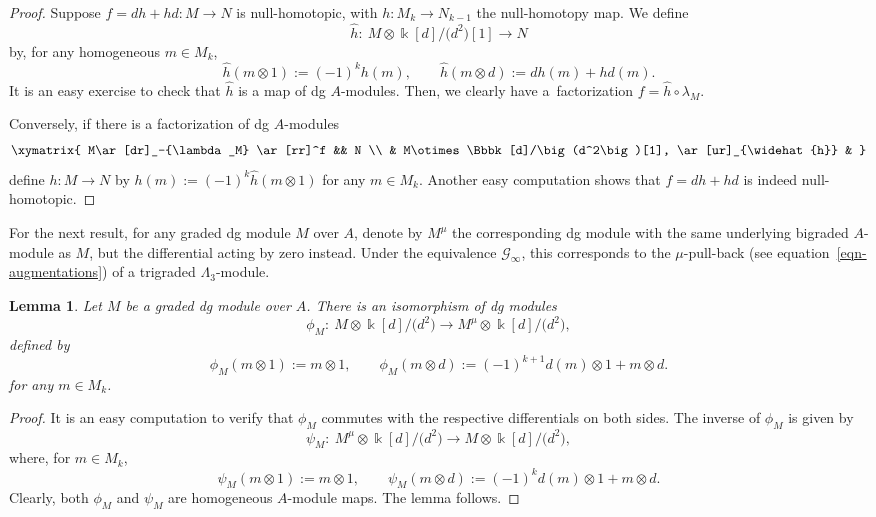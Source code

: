 \documentclass[pdftex]{sigma}
\newtheorem{lem}[thm]{Lemma}
\theoremstyle{definition}
\numberwithin{equation}{section}
\def\lra{{\longrightarrow}}
\def\mc{\mathcal}
\begin{document}
\begin{proof}Suppose $f=dh+hd\colon M\lra N$ is null-homotopic, with $h\colon M_{k}\lra N_{k-1}$ the null-homo\-topy map. We define
\[
\widehat{h}\colon \ M\otimes \Bbbk[d]/\big(d^2\big)[1]\lra N
\]
by, for any homogeneous $m\in M_{k}$,
\[
\widehat{h}(m\otimes 1):= (-1)^{k}h(m),\qquad \widehat{h}(m\otimes d):=dh(m)+hd(m).
\]
It is an easy exercise to check that $\widehat{h}$ is a map of dg $A$-modules. Then, we clearly have a~fac\-toriza\-tion $ f=\widehat{h}\circ \lambda_M $.

Conversely, if there is a factorization of dg $A$-modules
\[
\begin{gathered}
\xymatrix{
M\ar[dr]_-{\lambda_M} \ar[rr]^f && N \\
 & M\otimes \Bbbk[d]/\big(d^2\big)[1], \ar[ur]_{\widehat{h}} &
}
\end{gathered}
\]
define $h\colon M\lra N$ by $h(m):=(-1)^k\widehat{h}(m\otimes 1)$ for any $m\in M_{k}$. Another easy computation shows that $f=dh+hd$ is indeed null-homotopic.
\end{proof}

For the next result, for any graded dg module $M$ over $A$, denote by $M^\mu$ the corresponding dg module with the same underlying bigraded $A$-module as $M$, but the differential acting by zero instead. Under the equivalence $\mc{G}_\infty$, this corresponds to the $\mu$-pull-back (see equation~\eqref{eqn-augmentations}) of a trigraded $\Lambda_3$-module.

\begin{lem}\label{lem-iso-dg-contractible-mod}
Let $M$ be a graded dg module over $A$. There is an isomorphism of dg modules
\[
\phi_M\colon \ M\otimes \Bbbk[d]/\big(d^2\big) \lra M^\mu \otimes \Bbbk[d]/\big(d^2\big),
\]
defined by
\[
\phi_M(m\otimes 1):= m\otimes 1, \qquad \phi_M(m\otimes d):= (-1)^{k+1}d(m)\otimes 1+m\otimes d.
\]
for any $m\in M_{k}$.
\end{lem}
\begin{proof}It is an easy computation to verify that $\phi_M$ commutes with the respective differentials on both sides. The inverse of $\phi_M$ is given by
\[
\psi_M \colon \ M^\mu\otimes \Bbbk[d]/\big(d^2\big)\lra M\otimes \Bbbk[d]/\big(d^2\big),
\]
where, for $m\in M_{k}$,
\[
\psi_M(m\otimes 1):=m\otimes 1,\qquad \psi_{M}(m\otimes d):=(-1)^kd(m)\otimes 1+m\otimes d.
\]
Clearly, both $\phi_M$ and $\psi_M$ are homogeneous $A$-module maps. The lemma follows.
\end{proof}
\end{document}
